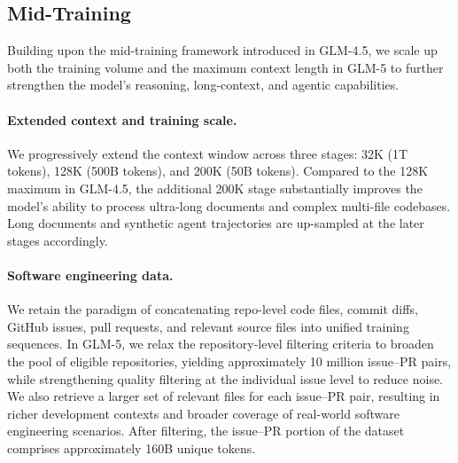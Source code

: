 \subsection{Mid-Training}

Building upon the mid-training framework introduced in GLM-4.5, we scale up both the training volume and the maximum context length in GLM-5 to further strengthen the model's reasoning, long-context, and agentic capabilities.

\paragraph{Extended context and training scale.} We progressively extend the context window across three stages: 32K (1T tokens), 128K (500B tokens), and 200K (50B tokens). Compared to the 128K maximum in GLM-4.5, the additional 200K stage substantially improves the model's ability to process ultra-long documents and complex multi-file codebases. Long documents and synthetic agent trajectories are up-sampled at the later stages accordingly.

\paragraph{Software engineering data.} We retain the paradigm of concatenating repo-level code files, commit diffs, GitHub issues, pull requests, and relevant source files into unified training sequences. In GLM-5, we relax the repository-level filtering criteria to broaden the pool of eligible repositories, yielding approximately 10 million issue–PR pairs, while strengthening quality filtering at the individual issue level to reduce noise. We also retrieve a larger set of relevant files for each issue–PR pair, resulting in richer development contexts and broader coverage of real-world software engineering scenarios. After filtering, the issue–PR portion of the dataset comprises approximately 160B unique tokens.

